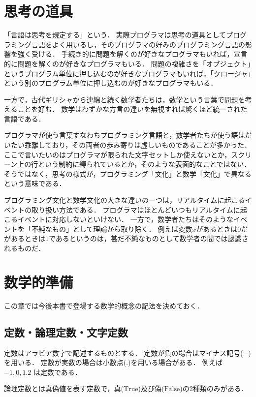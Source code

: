 \documentclass[twocolumn]{jsbook}
\newcommand{\falsevalue}{\text{False}}
\newcommand{\truevalue}{\text{True}}
\begin{document}
\chapter{思考の道具}

「言語は思考を規定する」という．
実際プログラマは思考の道具としてプログラミング言語をよく用いるし，そのプログラマの好みのプログラミング言語の影響を強く受ける．
手続き的に問題を解くのが好きなプログラマもいれば，宣言的に問題を解くのが好きなプログラマもいる．
問題の複雑さを「オブジェクト」というプログラム単位に押し込むのが好きなプログラマもいれば，「クロージャ」という別のプログラム単位に押し込むのが好きなプログラマもいる．

一方で，古代ギリシャから連綿と続く数学者たちは，数学という言葉で問題を考えることを好む．
数学はわずかな方言の違いを無視すれば驚くほど統一された言語である．

プログラマが使う言葉すなわちプログラミング言語と，数学者たちが使う語はだいたい乖離しており，その両者の歩み寄りは虚しいものであることが多かった．
ここで言いたいのはプログラマが限られた文字セットしか使えないとか，スクリーン上の行という制約に縛られているとか，そのような表面的なことではない．
そうではなく，思考の様式が，プログラミング「文化」と数学「文化」で異なるという意味である．

プログラミング文化と数学文化の大きな違いの一つは，リアルタイムに起こるイベントの取り扱い方法である．
プログラマはほとんどいつもリアルタイムに起こるイベントに対応しないといけない．
一方で，数学者たちはそのようなイベントを「不純なもの」として理論から取り除く．
例えば変数$x$があるときは$0$だがあるときは$1$であるというのは，甚だ不純なものとして数学者の間では認識されるものだ．

\chapter{数学的準備}

この章では今後本書で登場する数学的概念の記法を決めておく．

\section{定数・論理定数・文字定数}

定数はアラビア数字で記述するものとする．
定数が負の場合はマイナス記号($-$)を用いる．
定数が実数の場合は小数点($.$)を用いる場合がある．
例えば $-1, 0, 1.2$ は定数である．

論理定数とは真偽値を表す定数で，真($\truevalue$)及び偽($\falsevalue$)の2種類のみがある．
\end{document}

